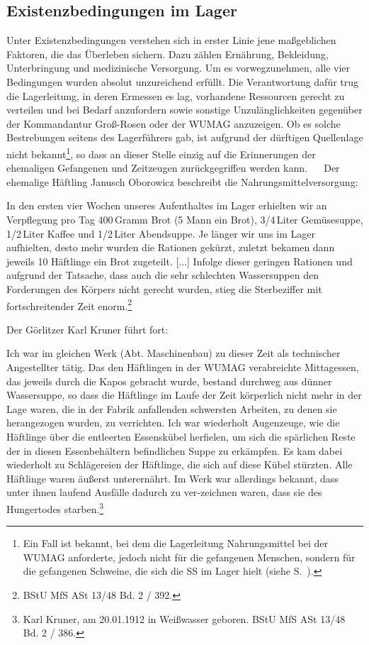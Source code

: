 \subsection{Existenzbedingungen im Lager}
Unter Existenzbedingungen verstehen sich in erster Linie jene maßgeblichen Faktoren, die das Überleben sichern. Dazu zählen Ernährung, Bekleidung, Unterbringung und medizinische Versorgung.
Um es vorwegzunehmen, alle vier Bedingungen wurden absolut unzureichend erfüllt.
Die Verantwortung dafür trug die Lagerleitung, in deren Ermessen es lag, vorhandene Ressourcen gerecht zu verteilen und bei Bedarf anzufordern sowie sonstige Unzulänglichkeiten gegenüber der Kommandantur Groß-Rosen oder der WUMAG anzuzeigen.
Ob es solche Bestrebungen seitens des Lagerführers gab, ist aufgrund der dürftigen Quellenlage nicht bekannt\footnote{Ein Fall ist bekannt, bei dem die Lagerleitung Nahrungsmittel bei der WUMAG anforderte, jedoch nicht für die gefangenen Menschen, sondern für die gefangenen Schweine, die sich die SS im Lager hielt (siehe S.~\pageref{schweine}).}, so dass an dieser Stelle einzig auf die Erinnerungen der ehemaligen Gefangenen und Zeitzeugen zurückgegriffen werden kann.
~
\newline~Der ehemalige Häftling Janusch Oborowicz beschreibt die Nahrungsmittelversorgung:
\begin{leftbar}
In den ersten vier Wochen unseres Aufenthaltes im Lager erhielten wir an Verpflegung pro Tag 400\,Gramm Brot (5 Mann ein Brot), 3/4\,Liter Gemüsesuppe, 1/2\,Liter Kaffee und 1/2\,Liter Abendsuppe. Je länger wir uns im Lager aufhielten, desto mehr wurden die Rationen gekürzt, zuletzt bekamen dann jeweils 10 Häftlinge ein Brot zugeteilt. [...] Infolge dieser geringen Rationen und aufgrund der Tatsache, dass auch die sehr schlechten Wassersuppen den Forderungen des Körpers nicht gerecht wurden, stieg die Sterbeziffer mit fortschreitender Zeit enorm.\footnote{BStU MfS ASt 13/48 Bd. 2 / 392.}\end{leftbar}
\newpage
Der Görlitzer Karl Kruner führt fort:
\begin{leftbar}
Ich war im gleichen Werk (Abt. Maschinenbau) zu dieser Zeit als technischer Angestellter tätig.
Das den Häftlingen in der WUMAG verabreichte Mittagessen, das jeweils durch die Kapos gebracht wurde, bestand durchweg aus dünner Wassersuppe, so dass die Häftlinge im Laufe der Zeit körperlich nicht mehr in der Lage waren, die in der Fabrik anfallenden schwersten Arbeiten, zu denen sie herangezogen wurden, zu verrichten. Ich war wiederholt Augenzeuge, wie die Häftlinge über die entleerten Essenskübel herfielen, um sich die spärlichen Reste der in diesen Essenbehältern befindlichen Suppe zu erkämpfen. Es kam dabei wiederholt zu Schlägereien der Häftlinge, die sich auf diese Kübel stürzten.
Alle Häftlinge waren äußerst unterernährt. Im Werk war allerdings bekannt, dass unter ihnen laufend Ausfälle dadurch zu ver-zeichnen waren, dass sie des Hungertodes starben.\footnote{Karl Kruner, am 20.01.1912 in Weißwasser geboren. BStU MfS ASt 13/48 Bd. 2 / 386.}
\end{leftbar}
